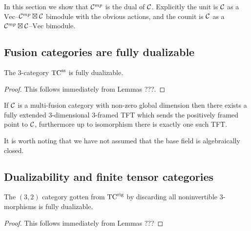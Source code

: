 \documentclass{amsart}
\begin{document}
In this section we show that $\mathcal C^{mp}$ is the dual of $\mathcal C$.  Explicitly the unit is $\mathcal C$ as a $\mathrm{Vec}$--$\mathcal C^{mp} \boxtimes \mathcal C$ bimodule with the obvious actions, and the counit is $\mathcal C$ as a $\mathcal C^{mp} \boxtimes \mathcal C$--$\mathrm{Vec}$ bimodule.


\subsection{Fusion categories are fully dualizable}

\begin{theorem}
The $3$-category ${\mathrm{TC}^{\text{ss}}}$ is fully dualizable.
\end{theorem}
\begin{proof}
This follows immediately from Lemmas ???.
\end{proof}

\begin{corollary}
If $\mathcal C$ is a multi-fusion category with non-zero global dimension then there exists a fully extended $3$-dimensional $3$-framed TFT which sends the positively framed point to $\mathcal C$, furthermore up to isomorphism there is exactly one such TFT.
\end{corollary}

\begin{remark}
It is worth noting that we have not assumed that the base field is algebraically closed.
\end{remark}


\subsection{Dualizability and finite tensor categories}

\begin{theorem}
The $(3,2)$ category gotten from ${\mathrm{TC}^{\text{rig}}}$ by discarding all noninvertible $3$-morphisms is fully dualizable.
\end{theorem}
\begin{proof}
This follows immediately from Lemmas ???
\end{proof}
\end{document}
